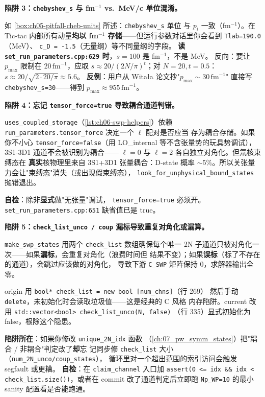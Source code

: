 \begin{pitfallbox}[label={box:ch06-pitfall-units-cheb}]
\textbf{陷阱 3：\texttt{chebyshev\_s} 与 fm\(^{-1}\) vs.~MeV/c 单位混淆。}

如 \cref{box:ch05-pitfall-cheb-units} 所述：\texttt{chebyshev\_s} 单位
与 \(p_i\) 一致（fm\(^{-1}\)）。在 Tic-tac 内部所有动量\textbf{均以
fm\(^{-1}\) 存储}——但运行参数对话里你会看到 \texttt{Tlab=190.0}（MeV）、
\texttt{c\_D = -1.5}（无量纲）等不同量纲的字段。
\textbf{读 \texttt{set\_run\_parameters.cpp:629} 时}，\(s = 100\)
是 fm\(^{-1}\)，不是 MeV。
反向：要让 \(p_{\max}\) 限制在 \(20\,\mathrm{fm}^{-1}\)，应取
\(s \approx 20 / (2N/\pi)^t\)；对 \(N = 20, t = 0.5\)：\(s \approx
20 / \sqrt{2 \cdot 20 / \pi} \approx 5.6\)。
\textbf{反例}：用户从 Witała 论文抄"\(p_{\max} \sim 30\,\mathrm{fm}^{-1}\)"
直接写 \texttt{chebyshev\_s=30}——得到 \(p_{\max} \approx 955\,\mathrm{fm}^{-1}\)。
\end{pitfallbox}

\begin{pitfallbox}[label={box:ch06-pitfall-coupled}]
\textbf{陷阱 4：忘记 \texttt{tensor\_force=true} 导致耦合通道判错。}

\texttt{uses\_coupled\_storage}（\cref{lst:ch06-swp-helpers}）依赖
\texttt{run\_parameters.tensor\_force} 决定一个 \(\ell\) 配对是否应当
存为耦合存储。如果你不小心 \texttt{tensor\_force=false}（用 LO\_internal
等不含张量势的玩具势调试），3S1-3D1 通道\textbf{不}会被识别为耦合——
\(\ell = 0\) 与 \(\ell = 2\) 各自独立对角化。但氘核束缚态在
\textbf{真实}核物理里来自 3S1+3D1 张量耦合：D-state 概率
\(\sim 5\%\)。所以关张量力会让"束缚态"消失（或出现假束缚态），
\texttt{look\_for\_unphysical\_bound\_states} 抛错退出。

\textbf{自检}：除非\textbf{显式}做"无张量"调试，
\texttt{tensor\_force=true} 必须开。\texttt{set\_run\_parameters.cpp:651}
缺省值已是 true。
\end{pitfallbox}

\begin{pitfallbox}[label={box:ch06-pitfall-checklist}]
\textbf{陷阱 5：\texttt{check\_list\_unco / coup} 漏标导致重复对角化或漏算。}

\texttt{make\_swp\_states} 用两个 \texttt{check\_list} 数组确保每个唯一
2N 子通道只被对角化一次——如果\textbf{漏标}，会重复对角化（浪费时间但
结果不变）；如果\textbf{误标}（标了不存在的通道），会跳过应该做的对角化，
导致下游 \texttt{C\_SWP} 矩阵保持 0，求解器输出全零。

origin 用 \texttt{bool* check\_list = new bool [num\_chns]}（行 269）
然后手动 \texttt{delete}，未初始化时会读取垃圾值——这是经典的 C 风格
内存陷阱。current 改用 \texttt{std::vector<bool> check\_list\_unco(N, false)}
（行 335）显式初始化为 false，根除这个隐患。

\textbf{陷阱所在}：如果你修改 \texttt{unique\_2N\_idx} 函数
（\cref{ch:07_pw_symm_states}）把"耦合 / 非耦合"判定改了\textbf{却}忘
记同步修 \texttt{check\_list} 大小（\texttt{num\_2N\_unco/coup\_states}），
循环里对一个超出范围的索引访问会触发 segfault 或更糟。
\textbf{自检}：在 \texttt{claim\_channel} 入口加 \texttt{assert(0 <= idx
\&\& idx < check\_list.size())}，或者在 commit 改了通道判定后立即跑
\texttt{Np\_WP=10} 的最小 sanity 配置看是否能跑通。
\end{pitfallbox}

